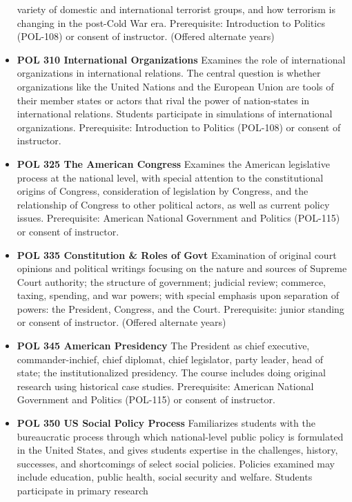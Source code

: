 \documentclass[
  letterpaper,
]{scrbook}
\begin{document}
\begin{itemize}
  variety of domestic and international terrorist groups, and how
  terrorism is changing in the post-Cold War era. Prerequisite:
  Introduction to Politics (POL-108) or consent of instructor. (Offered
  alternate years)
\item
  \textbf{POL 310 International Organizations} Examines the role of
  international organizations in international relations. The central
  question is whether organizations like the United Nations and the
  European Union are tools of their member states or actors that rival
  the power of nation-states in international relations. Students
  participate in simulations of international organizations.
  Prerequisite: Introduction to Politics (POL-108) or consent of
  instructor.\\
\item
  \textbf{POL 325 The American Congress} Examines the American
  legislative process at the national level, with special attention to
  the constitutional origins of Congress, consideration of legislation
  by Congress, and the relationship of Congress to other political
  actors, as well as current policy issues. Prerequisite: American
  National Government and Politics (POL-115) or consent of instructor.
\item
  \textbf{POL 335 Constitution \& Roles of Govt} Examination of original
  court opinions and political writings focusing on the nature and
  sources of Supreme Court authority; the structure of government;
  judicial review; commerce, taxing, spending, and war powers; with
  special emphasis upon separation of powers: the President, Congress,
  and the Court. Prerequisite: junior standing or consent of instructor.
  (Offered alternate years)
\item
  \textbf{POL 345 American Presidency} The President as chief executive,
  commander-inchief, chief diplomat, chief legislator, party leader,
  head of state; the institutionalized presidency. The course includes
  doing original research using historical case studies. Prerequisite:
  American National Government and Politics (POL-115) or consent of
  instructor.
\item
  \textbf{POL 350 US Social Policy Process} Familiarizes students with
  the bureaucratic process through which national-level public policy is
  formulated in the United States, and gives students expertise in the
  challenges, history, successes, and shortcomings of select social
  policies. Policies examined may include education, public health,
  social security and welfare. Students participate in primary research

\end{itemize}
\end{document}
